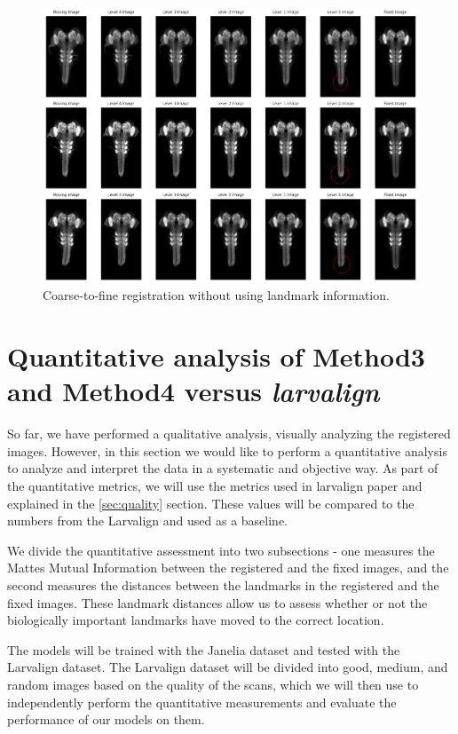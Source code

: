 \documentclass{report}
\begin{document}
	\begin{figure}[p!]
		\centering
		\includegraphics[width=\columnwidth]{resources/chapter4/method4/vanilla/registered_images.png}
		\caption{Coarse-to-fine registration without using landmark information.}
		\label{fig:method3_combine}
	\end{figure}

	\section{Quantitative analysis of Method3 and Method4 versus \emph{larvalign}}
	So far, we have performed a qualitative analysis, visually analyzing the registered images. However, in this section we would like to perform a quantitative analysis to analyze and interpret the data in a systematic and objective way. As part of the quantitative metrics, we will use the metrics used in larvalign paper \cite{larvalign} and explained in the \ref{sec:quality} section. These values will be compared to the numbers from the Larvalign and used as a baseline.
	
	We divide the quantitative assessment into two subsections - one measures the Mattes Mutual Information between the registered and the fixed images, and the second measures the distances between the landmarks in the registered and the fixed images. These landmark distances allow us to assess whether or not the biologically important landmarks have moved to the correct location.
	
	The models will be trained with the {Janelia dataset} and tested with the {Larvalign dataset}. The {Larvalign dataset} will be divided into {good, medium, and random} images based on the quality of the scans, which we will then use to independently perform the quantitative measurements and evaluate the performance of our models on them.
	
\end{document}
